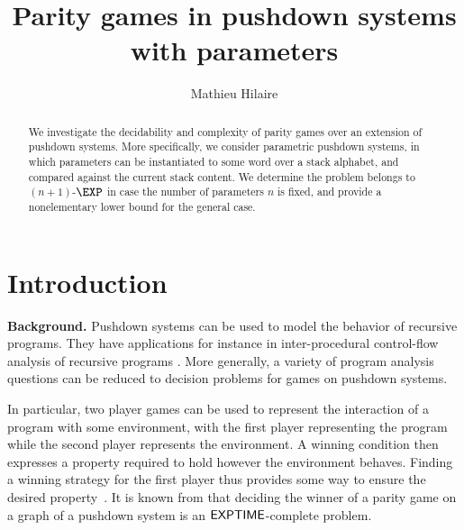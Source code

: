 \documentclass[a4paper,UKenglish,cleveref, autoref, thm-restate]{lipics-v2021}
\title{Parity games in pushdown systems with parameters}
\author{Mathieu Hilaire}{Université Paris-Saclay,
CNRS,
ENS Paris-Saclay,
LMF,
Gif-sur-Yvette, France
}{hilaire@lsv.fr}{}{This work was partly done while the author was supported by the 
Agence Nationale de la Recherche grant no.  ANR-17-CE40-0010.}
\begin{document}
\maketitle


\begin{abstract}
	We investigate the decidability and complexity of
	parity games over an extension of pushdown systems.
	More specifically, we consider parametric pushdown systems, in
	which parameters can be instantiated to some word over a stack alphabet,
	and compared against the current stack content.
	We determine the problem
	belongs to $(n+1)$-$\EXP$ in case the number of parameters
$n$ is fixed, and provide a nonelementary lower bound for the general case. 
\end{abstract}

\section{Introduction}


{\bf Background.} Pushdown systems can be used to model the behavior of recursive programs.
They have applications for instance in inter-procedural control-flow analysis of recursive programs \cite{esparza1999automata, reps2005weighted}.
More generally, a variety of 
 program analysis questions can be reduced to decision problems for games on pushdown systems.




In particular, two player games can be used to
 represent the
interaction of a program with some environment, with the first player representing the program while the second player represents the environment. A winning condition then expresses a property required to hold however the environment behaves. Finding a winning strategy for the first player
thus provides some way 
 to ensure the desired 
property~\cite{arnold2003games}.
It is known from \cite{walukiewicz1996pushdown} that deciding the winner of a parity game on a graph of a pushdown system is an ${\sf EXPTIME}$-complete problem.
\end{document}
